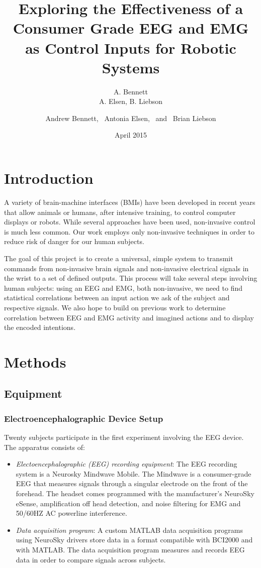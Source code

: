 \documentclass[journal]{IEEEtran}
\title{Exploring the Effectiveness of a Consumer Grade EEG and EMG as Control Inputs for Robotic Systems}
\author{A. Bennett \\ A. Elsen, B. Liebson}
\author{Andrew Bennett,~%
        Antonia Elsen,~%
        and~%
        Brian Liebson%
        }
\date{April 2015}
\begin{document}
\maketitle

\begin{abstract}
\blindtext[1]
\end{abstract}

\section{Introduction}
A variety of brain-machine interfaces (BMIs) have been developed in recent years that allow animals or humans, after intensive training, to control computer displays or robots.  While several approaches have been used, non-invasive control is much less common. Our work employs only non-invasive techniques in order to reduce risk of danger for our human subjects.

The goal of this project is to create a universal, simple system to transmit commands from non-invasive brain signals and non-invasive electrical signals in the wrist to a set of defined outputs. This process will take several steps involving human subjects: using an EEG and EMG, both non-invasive, we need to find statistical correlations between an input action we ask of the subject and respective signals. We also hope to build on previous work to determine correlation between EEG and EMG activity and imagined actions and to display the encoded intentions.

\section{Methods}
\subsection{Equipment}
\subsubsection{Electroencephalographic Device Setup}
Twenty subjects participate in the first experiment involving the EEG device.
The apparatus consists of:
\begin{itemize}
    \item \textit{Electoencephalographic (EEG) recording equipment}: The EEG recording system is a Neurosky Mindwave Mobile. The Mindwave is a consumer-grade EEG that measures signals through a singular electrode on the front of the forehead. The headset comes programmed with the manufacturer’s NeuroSky eSense, amplification off head detection, and noise filtering for EMG and 50/60HZ AC powerline interference. 
    \item \textit{Data acquisition program}: A custom MATLAB data acquisition programs using NeuroSky drivers store data in a format compatible with BCI2000 and with MATLAB.  The data acquisition program measures and records EEG data in order to compare signals across subjects.
\end{itemize}
\end{document}
